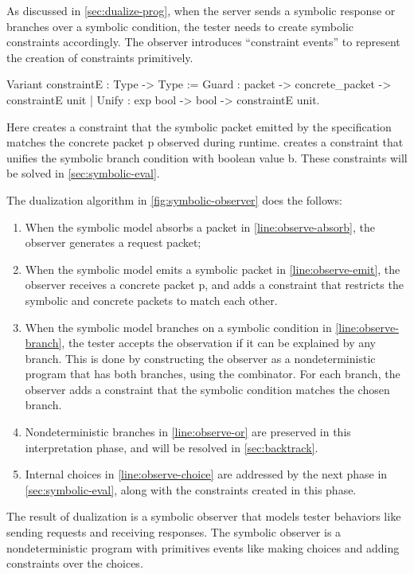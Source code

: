 As discussed in \autoref{sec:dualize-prog}, when the server sends a symbolic
response or branches over a symbolic condition, the tester needs to create
symbolic constraints accordingly.  The observer introduces ``constraint events''
to represent the creation of constraints primitively.
\begin{coq}
  Variant constraintE : Type -> Type :=
    Guard : packet -> concrete_packet -> constraintE unit
  | Unify : exp bool -> bool -> constraintE unit.
\end{coq}

Here  creates a constraint that the symbolic packet 
emitted by the specification matches the concrete packet \ilc p observed during
runtime.   creates a constraint that unifies the symbolic
branch condition  with boolean value \ilc b.  These constraints will be
solved in \autoref{sec:symbolic-eval}.

The dualization algorithm in \autoref{fig:symbolic-observer} does the follows:
\begin{enumerate}
  \item When the symbolic model absorbs a packet in
    \autoref{line:observe-absorb}, the observer generates a request packet;
  \item When the symbolic model emits a symbolic packet  in
    \autoref{line:observe-emit}, the observer receives a concrete packet \ilc p,
    and adds a constraint that restricts the symbolic and concrete packets to
    match each other.
  \item When the symbolic model branches on a symbolic condition  in
    \autoref{line:observe-branch}, the tester accepts the observation if it can
    be explained by any branch.  This is done by constructing the observer as a
    nondeterministic program that has both branches, using the 
    combinator.  For each branch, the observer adds a constraint that the
    symbolic condition matches the chosen branch.
  \item Nondeterministic branches in \autoref{line:observe-or} are preserved in
    this interpretation phase, and will be resolved in \autoref{sec:backtrack}.
  \item Internal choices in \autoref{line:observe-choice} are addressed by the
    next phase in \autoref{sec:symbolic-eval}, along with the constraints
    created in this phase.
\end{enumerate}

The result of dualization is a symbolic observer that models tester behaviors
like sending requests and receiving responses.  The symbolic observer is a
nondeterministic program with primitives events like making choices and adding
constraints over the choices.

